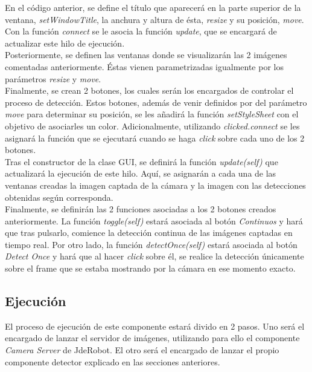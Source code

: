 \documentclass[a4paper, 12pt, oneside]{book}
\begin{document}
En el código anterior, se define el título que aparecerá en la parte superior de la ventana, \textit{setWindowTitle}, la anchura y altura de ésta, \textit{resize} y su posición, \textit{move}. Con la función \textit{connect} se le asocia la función \textit{update}, que se encargará de actualizar este hilo de ejecución.\\

Posteriormente, se definen las ventanas donde se visualizarán las 2 imágenes comentadas anteriormente. Éstas vienen parametrizadas igualmente por los parámetros \textit{resize} y \textit{move}.\\

Finalmente, se crean 2 botones, los cuales serán los encargados de controlar el proceso de detección. Estos botones, además de venir definidos por del parámetro \textit{move} para determinar su posición, se les añadirá la función \textit{setStyleSheet} con el objetivo de asociarles un color. Adicionalmente, utilizando \textit{clicked.connect} se les asignará la función que se ejecutará cuando se haga \textit{click} sobre cada uno de los 2 botones.\\

Tras el constructor de la clase GUI, se definirá la función \textit{update(self)} que actualizará la ejecución de este hilo. Aquí, se asignarán a cada una de las ventanas creadas la imagen captada de la cámara y la imagen con las detecciones obtenidas según corresponda.\\

Finalmente, se definirán las 2 funciones asociadas a los 2 botones creados anteriormente. La función \textit{toggle(self)} estará asociada al botón \textit{Continuos} y hará que tras pulsarlo, comience la detección continua de las imágenes captadas en tiempo real. Por otro lado, la función \textit{detectOnce(self)} estará asociada al botón \textit{Detect Once} y hará que al hacer \textit{click} sobre él, se realice la detección únicamente sobre el frame que se estaba mostrando por la cámara en ese momento exacto.

\subsection{Ejecución}

El proceso de ejecución de este componente estará divido en 2 pasos. Uno será el encargado de lanzar el servidor de imágenes, utilizando para ello el componente \textit{Camera Server} de JdeRobot. El otro será el encargado de lanzar el propio componente detector explicado en las secciones anteriores.\\
\end{document}
